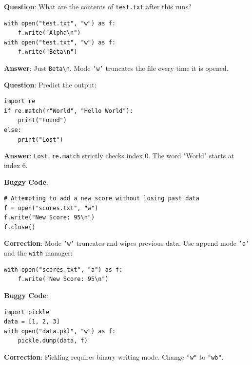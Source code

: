 \begin{outputprediction}
\textbf{Question}: What are the contents of \texttt{test.txt} after this runs?
\begin{lstlisting}[language=Python3]
with open("test.txt", "w") as f:
    f.write("Alpha\n")
with open("test.txt", "w") as f:
    f.write("Beta\n")
\end{lstlisting}
\textbf{Answer}: Just \texttt{Beta\textbackslash n}. Mode \texttt{'w'} truncates the file every time it is opened.
\end{outputprediction}

\begin{outputprediction}
\textbf{Question}: Predict the output:
\begin{lstlisting}[language=Python3]
import re
if re.match(r"World", "Hello World"):
    print("Found")
else:
    print("Lost")
\end{lstlisting}
\textbf{Answer}: \texttt{Lost}. \texttt{re.match} strictly checks index 0. The word "World" starts at index 6.
\end{outputprediction}


\begin{debuggingbox}
\textbf{Buggy Code}:
\begin{lstlisting}[language=Python3]
# Attempting to add a new score without losing past data
f = open("scores.txt", "w")
f.write("New Score: 95\n")
f.close()
\end{lstlisting}
\textbf{Correction}: Mode \texttt{'w'} truncates and wipes previous data. Use append mode \texttt{'a'} and the \texttt{with} manager:
\begin{lstlisting}[language=Python3]
with open("scores.txt", "a") as f:
    f.write("New Score: 95\n")
\end{lstlisting}
\end{debuggingbox}

\begin{debuggingbox}
\textbf{Buggy Code}:
\begin{lstlisting}[language=Python3]
import pickle
data = [1, 2, 3]
with open("data.pkl", "w") as f:
    pickle.dump(data, f)
\end{lstlisting}
\textbf{Correction}: Pickling requires binary writing mode. Change \texttt{"w"} to \texttt{"wb"}.
\end{debuggingbox}

